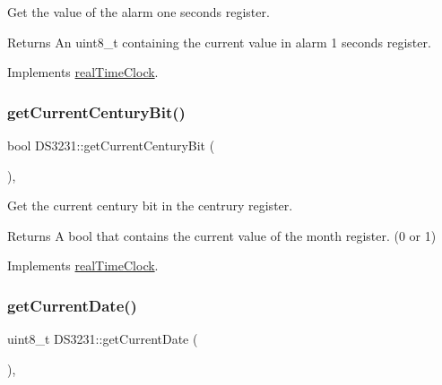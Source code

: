 Get the value of the alarm one seconds register. 

\begin{DoxyReturn}{Returns}
An uint8\+\_\+t containing the current value in alarm 1 seconds register. 
\end{DoxyReturn}


Implements \mbox{\hyperlink{classreal_time_clock_af4ff1775432a08af7e41db135d16bf65}{real\+Time\+Clock}}.

\mbox{\label{class_d_s3231_a38dfc1567d3419d5aeecd2062d4121c7}} 
\subsubsection{\texorpdfstring{get\+Current\+Century\+Bit()}{getCurrentCenturyBit()}}
{\footnotesize\ttfamily bool D\+S3231\+::get\+Current\+Century\+Bit (\begin{DoxyParamCaption}{ }\end{DoxyParamCaption})\hspace{0.3cm}{\ttfamily [override]}, {\ttfamily [virtual]}}



Get the current century bit in the centrury register. 

\begin{DoxyReturn}{Returns}
A bool that contains the current value of the month register. (0 or 1) 
\end{DoxyReturn}


Implements \mbox{\hyperlink{classreal_time_clock_ae0b15649f9135be8f0d9ada65084c28f}{real\+Time\+Clock}}.

\mbox{\label{class_d_s3231_a346341a4d3c6615103b33fbff7a12884}} 
\subsubsection{\texorpdfstring{get\+Current\+Date()}{getCurrentDate()}}
{\footnotesize\ttfamily uint8\+\_\+t D\+S3231\+::get\+Current\+Date (\begin{DoxyParamCaption}{ }\end{DoxyParamCaption})\hspace{0.3cm}{\ttfamily [override]}, {\ttfamily [virtual]}}




